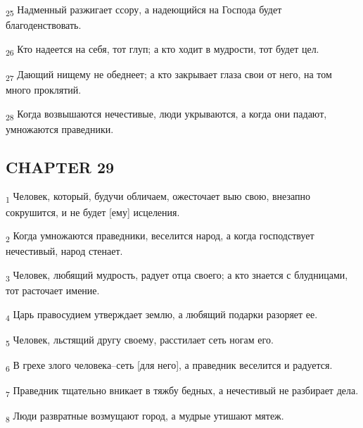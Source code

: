 \begin{tcolorbox}
\textsubscript{25} Надменный разжигает ссору, а надеющийся на Господа будет благоденствовать.
\end{tcolorbox}
\begin{tcolorbox}
\textsubscript{26} Кто надеется на себя, тот глуп; а кто ходит в мудрости, тот будет цел.
\end{tcolorbox}
\begin{tcolorbox}
\textsubscript{27} Дающий нищему не обеднеет; а кто закрывает глаза свои от него, на том много проклятий.
\end{tcolorbox}
\begin{tcolorbox}
\textsubscript{28} Когда возвышаются нечестивые, люди укрываются, а когда они падают, умножаются праведники.
\end{tcolorbox}
\subsection{CHAPTER 29}
\begin{tcolorbox}
\textsubscript{1} Человек, который, будучи обличаем, ожесточает выю свою, внезапно сокрушится, и не будет [ему] исцеления.
\end{tcolorbox}
\begin{tcolorbox}
\textsubscript{2} Когда умножаются праведники, веселится народ, а когда господствует нечестивый, народ стенает.
\end{tcolorbox}
\begin{tcolorbox}
\textsubscript{3} Человек, любящий мудрость, радует отца своего; а кто знается с блудницами, тот расточает имение.
\end{tcolorbox}
\begin{tcolorbox}
\textsubscript{4} Царь правосудием утверждает землю, а любящий подарки разоряет ее.
\end{tcolorbox}
\begin{tcolorbox}
\textsubscript{5} Человек, льстящий другу своему, расстилает сеть ногам его.
\end{tcolorbox}
\begin{tcolorbox}
\textsubscript{6} В грехе злого человека--сеть [для него], а праведник веселится и радуется.
\end{tcolorbox}
\begin{tcolorbox}
\textsubscript{7} Праведник тщательно вникает в тяжбу бедных, а нечестивый не разбирает дела.
\end{tcolorbox}
\begin{tcolorbox}
\textsubscript{8} Люди развратные возмущают город, а мудрые утишают мятеж.
\end{tcolorbox}
